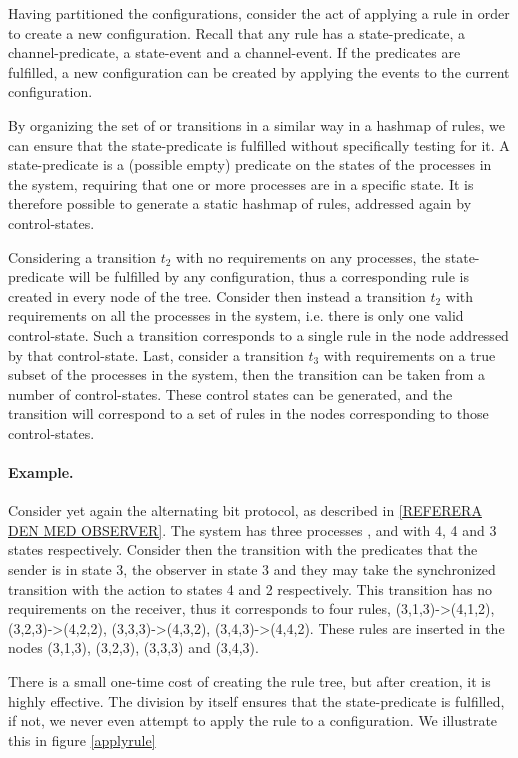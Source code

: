 Having partitioned the configurations, consider the act of applying a rule in order to create a new configuration. Recall that any rule has a state-predicate, a channel-predicate, a state-event and a channel-event. If the predicates are fulfilled, a new configuration can be created by applying the events to the current configuration.

By organizing the set of  or transitions in a similar way in a hashmap of rules, we can ensure that the state-predicate is fulfilled without specifically testing for it. A state-predicate is a (possible empty) predicate on the states of the processes in the system, requiring that one or more processes are in a specific state. It is therefore possible to generate a static hashmap of rules, addressed again by control-states.

Considering a transition $t_2$ with no requirements on any processes, the state-predicate will be fulfilled by any configuration, thus a corresponding rule is created in every node of the tree. Consider then instead a transition $t_2$ with requirements on all the processes in the system, i.e. there is only one valid control-state. Such a transition corresponds to a single rule in the node addressed by that control-state. Last, consider a transition $t_3$ with requirements on a true subset of the processes in the system, then the transition can be taken from a number of control-states. These control states can be generated, and the transition will correspond to a set of rules in the nodes corresponding to those control-states.

\paragraph{Example.} Consider yet again the alternating bit protocol, as described in \ref{REFERERA DEN MED OBSERVER}. The system has three processes ,  and  with 4, 4 and 3 states respectively. Consider then the transition with the predicates that the sender is in state 3, the observer in state 3 and they may take the synchronized transition with the action  to states 4 and 2 respectively. This transition has no requirements on the receiver, thus it corresponds to four rules, (3,1,3)->(4,1,2), (3,2,3)->(4,2,2), (3,3,3)->(4,3,2), (3,4,3)->(4,4,2). These rules are inserted in the nodes (3,1,3), (3,2,3), (3,3,3) and (3,4,3).

There is a small one-time cost of creating the rule tree, but after creation, it is highly effective. The division by itself ensures that the state-predicate is fulfilled, if not, we never even attempt to apply the rule to a configuration. We illustrate this in figure \ref{applyrule} 

